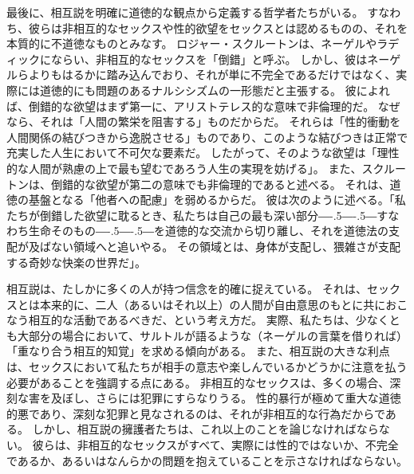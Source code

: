 \documentclass[paper=a4,book,openany]{jlreq}
\def\DDASH{―\kern-.5\zw―\kern-.5\zw―}
\begin{document}
最後に、相互説を明確に道徳的な観点から定義する哲学者たちがいる。
すなわち、彼らは非相互的なセックスや性的欲望をセックスとは認めるものの、それを本質的に不道徳なものとみなす。
ロジャー・スクルートンは、ネーゲルやラディックにならい、非相互的なセックスを「倒錯」と呼ぶ。
しかし、彼はネーゲルらよりもはるかに踏み込んでおり、それが単に不完全であるだけではなく、実際には道徳的にも問題のあるナルシシズムの一形態だと主張する。
彼によれば、倒錯的な欲望はまず第一に、アリストテレス的な意味で非倫理的だ。
なぜなら、それは「人間の繁栄を阻害する」ものだからだ。
それらは「性的衝動を人間関係の結びつきから逸脱させる」ものであり、このような結びつきは正常で充実した人生において不可欠な要素だ。
したがって、そのような欲望は「理性的な人間が熟慮の上で最も望むであろう人生の実現を妨げる」\citep[p.317]{scruton06:_sexual_desir}。
また、スクルートンは、倒錯的な欲望が第二の意味でも非倫理的であると述べる。
それは、道徳の基盤となる「他者への配慮」を弱めるからだ。
彼は次のように述べる。「私たちが倒錯した欲望に耽るとき、私たちは自己の最も深い部分{\DDASH}すなわち生命そのもの{\DDASH}を道徳的な交流から切り離し、それを道徳法の支配が及ばない領域へと追いやる。
その領域とは、身体が支配し、猥雑さが支配する奇妙な快楽の世界だ」\citep[p.289]{scruton06:_sexual_desir}。

相互説は、たしかに多くの人が持つ信念を的確に捉えている。
それは、セックスとは本来的に、二人（あるいはそれ以上）の人間が自由意思のもとに共におこなう相互的な活動であるべきだ、という考え方だ。
実際、私たちは、少なくとも大部分の場合において、サルトルが語るような（ネーゲルの言葉を借りれば）「重なり合う相互的知覚」を求める傾向がある。
また、相互説の大きな利点は、セックスにおいて私たちが相手の意志や楽しんでいるかどうかに注意を払う必要があることを強調する点にある。
非相互的なセックスは、多くの場合、深刻な害を及ぼし、さらには犯罪にすらなりうる。
性的暴行が極めて重大な道徳的悪であり、深刻な犯罪と見なされるのは、それが非相互的な行為だからである\citep[cf.][]{woollard19:_promis_paedop_rape_signif_sexual}。
しかし、相互説の擁護者たちは、これ以上のことを論じなければならない。
彼らは、非相互的なセックスがすべて、実際には性的ではないか、不完全であるか、あるいはなんらかの問題を抱えていることを示さなければならない。
\end{document}
